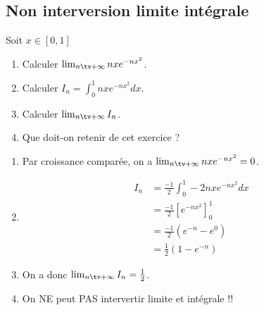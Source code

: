 \subsection{Non interversion limite intégrale}
\begin{exercice}
Soit $x\in [0,1]$ 

\begin{enumerate}
\item Calculer $\lim_{n\tv+\infty} nxe^{-nx^2}$.
\item Calculer $I_n=\int_0^1 nxe^{-nx^2}dx$.
\item Calculer $\lim_{n\tv+\infty} I_n$.
\item Que doit-on retenir de cet exercice ? 
\end{enumerate}
\end{exercice}


\begin{correction}
\begin{enumerate}
\item Par croissance comparée, on a $\lim_{n\tv+\infty} nxe^{-nx^2}=0$.
\item \begin{align*}
I_n&=\frac{-1}{2}\int_0^1 -2nxe^{-nx^2}dx\\
	&=\frac{-1}{2}[e^{-nx^2}]_0^1 \\
	&=\frac{-1}{2}(e^{-n} -e^{0}) \\
		&=\frac{1}{2}(1-e^{-n}) 
\end{align*}
\item On  a donc $\lim_{n\tv+\infty} I_n=\frac{1}{2}$. 
\item On NE peut PAS intervertir limite et intégrale !!
\end{enumerate}
\end{correction}